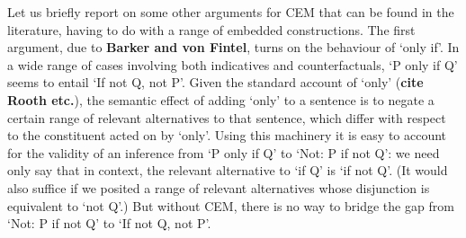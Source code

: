 \documentclass[If.tex]{subfiles}
\begin{document}
Let us briefly report on some other arguments for CEM that can be found in the literature, having to do with a range of embedded constructions. The first argument, due to \textbf{Barker and von Fintel}, turns on the behaviour of ‘only if’. In a wide range of cases involving both indicatives and counterfactuals, ‘P only if Q’ seems to entail ‘If not Q, not P’. Given the standard account of ‘only’ (\textbf{cite Rooth etc.}), the semantic effect of adding ‘only’ to a sentence is to negate a certain range of relevant alternatives to that sentence, which differ with respect to the constituent acted on by ‘only’. Using this machinery it is easy to account for the validity of an inference from ‘P only if Q’ to ‘Not: P if not Q’: we need only say that in context, the relevant alternative to ‘if Q’ is ‘if not Q’. (It would also suffice if we posited a range of relevant alternatives whose disjunction is equivalent to ‘not Q’.) But without CEM, there is no way to bridge the gap from ‘Not: P if not Q’ to ‘If not Q, not P’.%
\end{document}
